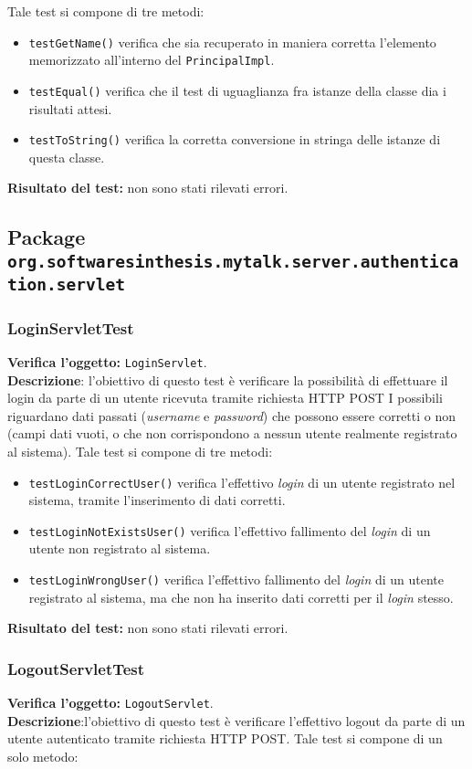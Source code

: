 Tale test si compone di tre metodi:
\begin{itemize}
\item \texttt{testGetName()} verifica che sia recuperato in maniera corretta l'elemento memorizzato all'interno del \texttt{PrincipalImpl}.
\item \texttt{testEqual()} verifica che il test di uguaglianza fra istanze della classe dia i risultati attesi.
\item \texttt{testToString()} verifica la corretta conversione in stringa delle istanze di questa classe.
\end{itemize}
\textbf{Risultato del test:} non sono stati rilevati errori.

\subsection{Package \texttt{org.softwaresinthesis.mytalk.server.authentication.servlet}}
\subsubsection{LoginServletTest}
\textbf{Verifica l'oggetto:} \texttt{LoginServlet}.\\
\textbf{Descrizione}: l'obiettivo di questo test è verificare la possibilità di effettuare il login da parte di un utente ricevuta tramite richiesta HTTP POST I possibili  riguardano dati passati (\textit{username} e \textit{password}) che possono essere corretti o non (campi dati vuoti, o che non corrispondono a nessun utente realmente registrato al sistema).
Tale test si compone di tre metodi:
\begin{itemize}
\item \texttt{testLoginCorrectUser()} verifica l'effettivo \textit{login} di un utente registrato nel sistema, tramite l'inserimento di dati corretti.
\item \texttt{testLoginNotExistsUser()} verifica l'effettivo fallimento del \textit{login} di un utente non registrato al sistema.
\item \texttt{testLoginWrongUser()} verifica l'effettivo fallimento del \textit{login} di un utente  registrato al sistema, ma che non ha inserito dati corretti per il \textit{login} stesso.
\end{itemize}
\textbf{Risultato del test:} non sono stati rilevati errori.

\subsubsection{LogoutServletTest}
\textbf{Verifica l'oggetto:} \texttt{LogoutServlet}.\\
\textbf{Descrizione}:l'obiettivo di questo test è verificare l'effettivo logout da parte di un utente autenticato tramite richiesta HTTP POST.
Tale test si compone di un solo metodo:

